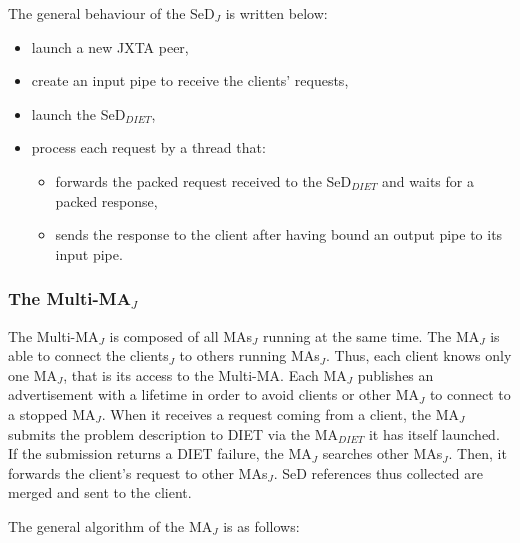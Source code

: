 The general behaviour of the SeD$_{J}$ is written below:

\begin{itemize}
  
\item{launch a new JXTA peer,}
\item{create an input pipe to receive the clients' requests,}
\item{launch the SeD$_{DIET}$,}
\item{process each request by a thread that:
\begin{itemize}
\item{forwards the packed request received to the SeD$_{DIET}$ and
    waits for a packed response,}
\item{sends the response to the client after having bound an output
    pipe to its input pipe.}
\end {itemize}}
\end{itemize}

\subsubsection{The Multi-MA$_{J}$}
\label{sssec:jxtamultima}

The Multi-MA$_{J}$ is composed of all MAs$_{J}$ running at the same
time. The MA$_{J}$ is able to connect the clients$_{J}$ to others
running MAs$_{J}$. Thus, each client knows only one MA$_{J}$, that is
its access to the Multi-MA. Each MA$_{J}$ publishes an advertisement
with a lifetime in order to avoid clients or other MA$_{J}$ to connect
to a stopped MA$_{J}$. When it receives a request coming from a
client, the MA$_{J}$ submits the problem description to DIET via the
MA$_{DIET}$ it has itself launched. If the submission returns a DIET
failure, the MA$_{J}$ searches other MAs$_{J}$. Then, it forwards the
client's request to other MAs$_{J}$. SeD references thus collected are
merged and sent to the client.

The general algorithm of the MA$_{J}$ is as follows:

